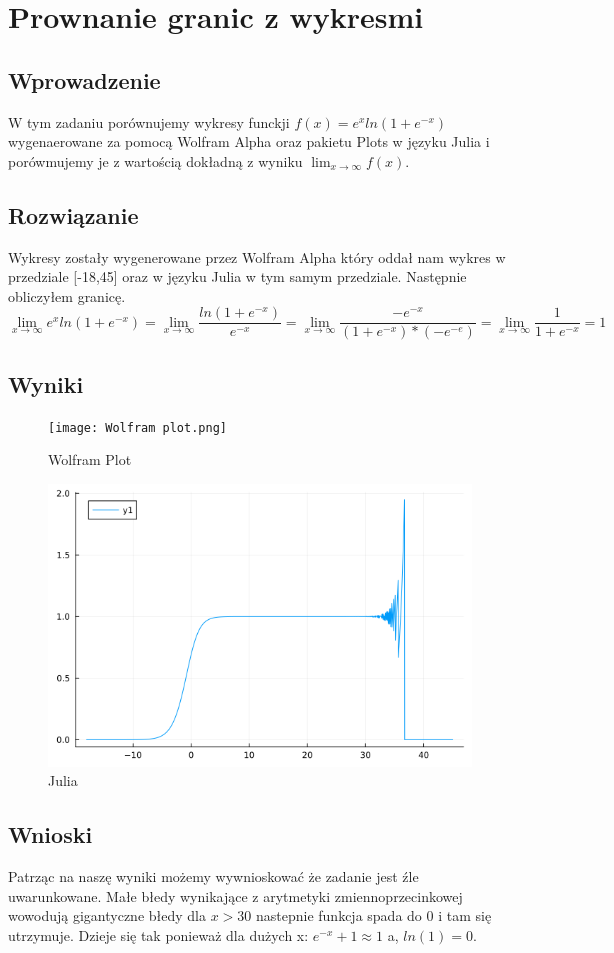 \documentclass{article}
\begin{document}
\section{Prownanie granic z wykresmi}
    \subsection{Wprowadzenie}
    W tym zadaniu porównujemy wykresy funckji $f(x) = e^xln(1+e^{-x})$ wygenaerowane za pomocą Wolfram Alpha oraz pakietu Plots w języku Julia i porówmujemy je z wartością dokładną z wyniku $\lim_{x\to\infty}f(x)$. 
    \subsection{Rozwiązanie}
    Wykresy zostały wygenerowane przez Wolfram Alpha który oddał nam wykres w przedziale [-18,45] oraz w języku Julia w tym samym przedziale. Następnie obliczyłem granicę.
    \[\lim_{x\to\infty}e^xln(1+e^{-x})=\lim_{x\to\infty}\frac{ln(1+e^{-x})}{e^{-x}}=\lim_{x\to\infty}\frac{-e^{-x}}{(1+e^{-x})*(-e^{-e})}=\lim_{x\to\infty}\frac{1}{1+e^{-x}}=1\]
    \subsection{Wyniki}
    \begin{figure}[H]
        \centering
        \texttt{[image: Wolfram plot.png]}
        \caption{Wolfram Plot}
        \label{fig:enter-label}
    \end{figure}
    \begin{figure}[H]
        \centering
        \includegraphics[width=0.75\linewidth]{2.2.png}
        \caption{Julia}
        \label{fig:enter-label}
    \end{figure}
    \subsection{Wnioski}
    Patrząc na naszę wyniki możemy wywnioskować że zadanie jest źle uwarunkowane. Małe błedy wynikające z arytmetyki zmiennoprzecinkowej wowodują gigantyczne błedy dla $x > 30$ nastepnie funkcja spada do 0 i tam się utrzymuje. Dzieje się tak ponieważ dla dużych x: $e^{-x} + 1 \approx 1$ a, $ln(1) = 0$.
\end{document}
